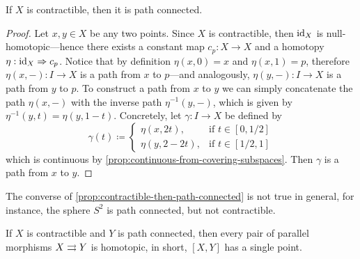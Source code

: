 \begin{proposition}
    \label{prop:contractible-then-path-connected}
    If \(X\) is contractible, then it is path connected.
\end{proposition}

\begin{proof}
    Let \(x, y \in X\) be any two points. Since \(X\) is contractible, then
    \(\operatorname{id}_X\) is null-homotopic---hence there exists a constant map \(c_p: X \to X\)
    and a homotopy \(\eta: \operatorname{id}_X \Rightarrow c_p\). Notice that by definition \(\eta(x, 0)
    = x\) and \(\eta(x, 1) = p\), therefore \(\eta(x, -): I \to X\) is a path from
    \(x\) to \(p\)---and analogously, \(\eta(y, -): I \to X\) is a path from \(y\)
    to \(p\). To construct a path from \(x\) to \(y\) we can simply concatenate the
    path \(\eta(x, -)\) with the inverse path \(\eta^{-1}(y, -)\), which is given by
    \(\eta^{-1}(y, t) = \eta(y, 1 - t)\). Concretely, let \(\gamma: I \to X\) be
    defined by
    \[
        \gamma(t) \coloneq
        \begin{cases}
            \eta(x, 2t),      & \text{if } t \in [0, 1/2] \\
            \eta(y, 2 - 2 t), & \text{if } t \in [1/2, 1]
        \end{cases}
    \]
    which is continuous by \cref{prop:continuous-from-covering-subspaces}. Then
    \(\gamma\) is a path from \(x\) to \(y\).
\end{proof}

\begin{remark}
    \label{rem:sphere-path-conn-but-not-contractible}
    The converse of \cref{prop:contractible-then-path-connected} is not true in
    general, for instance, the sphere \(S^2\) is path connected, but not
    contractible.
\end{remark}

\begin{corollary}
    \label{cor:contractible-to-path-connected-homotopic-maps}
    If \(X\) is contractible and \(Y\) is path connected, then every pair of
    parallel morphisms \(X \rightrightarrows Y\) is homotopic, in short, \([X, Y]\) has a single
    point.
\end{corollary}


